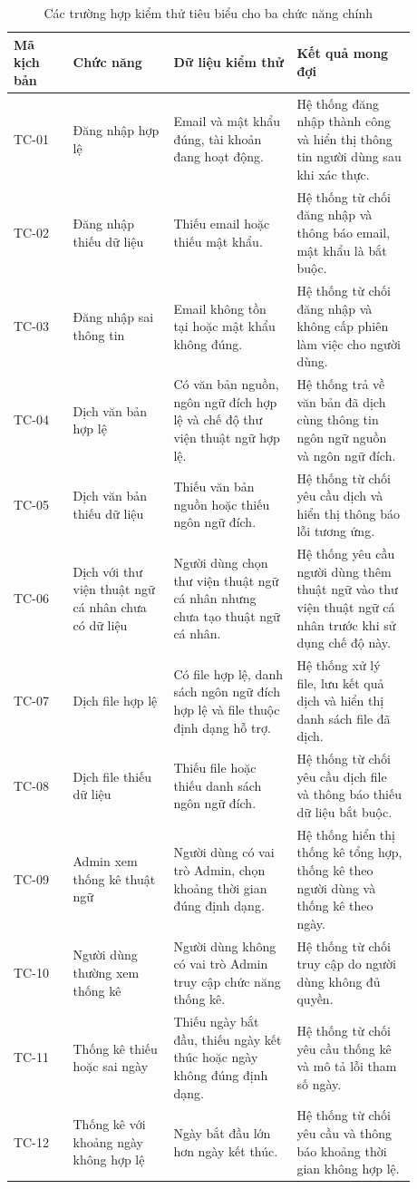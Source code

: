 ﻿\documentclass[../DoAn.tex]{subfiles}
\begin{document}
\begin{table}[htbp]
\centering
\caption{Các trường hợp kiểm thử tiêu biểu cho ba chức năng chính}
\label{table:test-main-cases}
\small
\setlength{\tabcolsep}{3pt}
\renewcommand{\arraystretch}{1.16}
\begin{tabular}{|p{0.13\linewidth}|p{0.22\linewidth}|p{0.27\linewidth}|p{0.26\linewidth}|}
\hline
\textbf{Mã kịch bản} & \textbf{Chức năng} & \textbf{Dữ liệu kiểm thử} & \textbf{Kết quả mong đợi} \\ \hline
TC-01 & Đăng nhập hợp lệ & Email và mật khẩu đúng, tài khoản đang hoạt động. & Hệ thống đăng nhập thành công và hiển thị thông tin người dùng sau khi xác thực. \\ \hline
TC-02 & Đăng nhập thiếu dữ liệu & Thiếu email hoặc thiếu mật khẩu. & Hệ thống từ chối đăng nhập và thông báo email, mật khẩu là bắt buộc. \\ \hline
TC-03 & Đăng nhập sai thông tin & Email không tồn tại hoặc mật khẩu không đúng. & Hệ thống từ chối đăng nhập và không cấp phiên làm việc cho người dùng. \\ \hline
TC-04 & Dịch văn bản hợp lệ & Có văn bản nguồn, ngôn ngữ đích hợp lệ và chế độ thư viện thuật ngữ hợp lệ. & Hệ thống trả về văn bản đã dịch cùng thông tin ngôn ngữ nguồn và ngôn ngữ đích. \\ \hline
TC-05 & Dịch văn bản thiếu dữ liệu & Thiếu văn bản nguồn hoặc thiếu ngôn ngữ đích. & Hệ thống từ chối yêu cầu dịch và hiển thị thông báo lỗi tương ứng. \\ \hline
TC-06 & Dịch với thư viện thuật ngữ cá nhân chưa có dữ liệu & Người dùng chọn thư viện thuật ngữ cá nhân nhưng chưa tạo thuật ngữ cá nhân. & Hệ thống yêu cầu người dùng thêm thuật ngữ vào thư viện thuật ngữ cá nhân trước khi sử dụng chế độ này. \\ \hline
TC-07 & Dịch file hợp lệ & Có file hợp lệ, danh sách ngôn ngữ đích hợp lệ và file thuộc định dạng hỗ trợ. & Hệ thống xử lý file, lưu kết quả dịch và hiển thị danh sách file đã dịch. \\ \hline
TC-08 & Dịch file thiếu dữ liệu & Thiếu file hoặc thiếu danh sách ngôn ngữ đích. & Hệ thống từ chối yêu cầu dịch file và thông báo thiếu dữ liệu bắt buộc. \\ \hline
TC-09 & Admin xem thống kê thuật ngữ & Người dùng có vai trò Admin, chọn khoảng thời gian đúng định dạng. & Hệ thống hiển thị thống kê tổng hợp, thống kê theo người dùng và thống kê theo ngày. \\ \hline
TC-10 & Người dùng thường xem thống kê & Người dùng không có vai trò Admin truy cập chức năng thống kê. & Hệ thống từ chối truy cập do người dùng không đủ quyền. \\ \hline
TC-11 & Thống kê thiếu hoặc sai ngày & Thiếu ngày bắt đầu, thiếu ngày kết thúc hoặc ngày không đúng định dạng. & Hệ thống từ chối yêu cầu thống kê và mô tả lỗi tham số ngày. \\ \hline
TC-12 & Thống kê với khoảng ngày không hợp lệ & Ngày bắt đầu lớn hơn ngày kết thúc. & Hệ thống từ chối yêu cầu và thông báo khoảng thời gian không hợp lệ. \\ \hline
\end{tabular}
\end{table}
\end{document}
